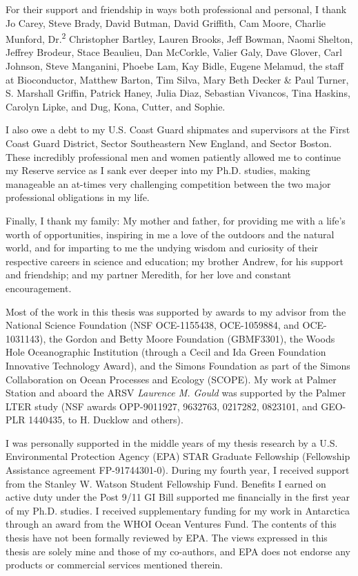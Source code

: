 \begin{singlespace}
For their support and friendship in ways both professional and personal, I thank Jo Carey, Steve Brady, David Butman, David Griffith, Cam Moore, Charlie Munford, Dr.\textsuperscript{2} Christopher Bartley, Lauren Brooks, Jeff Bowman, Naomi Shelton, Jeffrey Brodeur, Stace Beaulieu, Dan McCorkle, Valier Galy, Dave Glover, Carl Johnson, Steve Manganini, Phoebe Lam, Kay Bidle, Eugene Melamud, the staff at Bioconductor, Matthew Barton, Tim Silva, Mary Beth Decker \& Paul Turner, S. Marshall Griffin, Patrick Haney, Julia Diaz, Sebastian Vivancos, Tina Haskins, Carolyn Lipke, and Dug, Kona, Cutter, and Sophie.

I also owe a debt to my U.S. Coast Guard shipmates and supervisors at the First Coast Guard District, Sector Southeastern New England, and Sector Boston. These incredibly professional men and women patiently allowed me to continue my Reserve service as I sank ever deeper into my Ph.D. studies, making manageable an at-times very challenging competition between the two major professional obligations in my life.

Finally, I thank my family: My mother and father, for providing me with a life's worth of opportunities, inspiring in me a love of the outdoors and the natural world, and for imparting to me the undying wisdom and curiosity of their respective careers in science and education; my brother Andrew, for his support and friendship; and my partner Meredith, for her love and constant encouragement.

Most of the work in this thesis was supported by awards to my advisor from the National Science Foundation (NSF OCE-1155438, OCE-1059884, and OCE-1031143), the Gordon and Betty Moore Foundation (GBMF3301), the Woods Hole Oceanographic Institution (through a Cecil and Ida Green Foundation Innovative Technology Award), and the Simons Foundation as part of the Simons Collaboration on Ocean Processes and Ecology (SCOPE). My work at Palmer Station and aboard the ARSV \emph{Laurence M. Gould} was supported by the Palmer LTER study (NSF awards OPP-9011927, 9632763, 0217282, 0823101, and GEO-PLR 1440435, to H. Ducklow and others).

I was personally supported in the middle years of my thesis research by a U.S. Environmental Protection Agency (EPA) STAR Graduate Fellowship (Fellowship Assistance agreement FP-91744301-0). During my fourth year, I received support from the Stanley W. Watson Student Fellowship Fund. Benefits I earned on active duty under the Post 9/11 GI Bill supported me financially in the first year of my Ph.D. studies. I received supplementary funding for my work in Antarctica through an award from the WHOI Ocean Ventures Fund. The contents of this thesis have not been formally reviewed by EPA. The views expressed in this thesis are solely mine and those of my co-authors, and EPA does not endorse any products or commercial services mentioned therein.
\end{singlespace}
